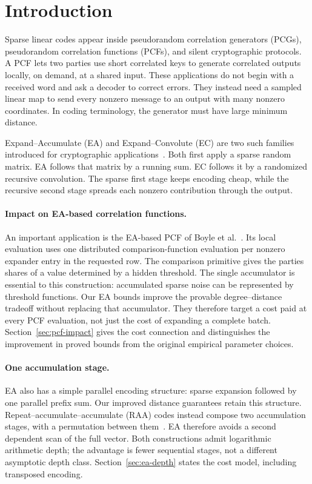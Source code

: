 \section{Introduction}
\label{sec:introduction}

Sparse linear codes appear inside pseudorandom correlation generators
(PCGs), pseudorandom correlation functions (PCFs), and silent cryptographic
protocols.  A PCF lets two parties use short correlated keys to generate
correlated outputs locally, on demand, at a shared input.  These applications
do not begin with a
received word and ask a decoder to correct errors.  They instead need a
sampled linear map to send every nonzero message to an output with many
nonzero coordinates.  In coding terminology, the generator must have large
minimum distance.

Expand--Accumulate (EA) and Expand--Convolute (EC) are two such families
introduced for cryptographic applications~\cite{EA,EC}.  Both first apply a
sparse random matrix.  EA follows that matrix by a running sum.  EC follows it
by a randomized recursive convolution.  The sparse first stage keeps encoding
cheap, while the recursive second stage spreads each nonzero contribution
through the output.

\paragraph{Impact on EA-based correlation functions.}
An important application is the EA-based PCF of Boyle et al.~\cite{EA}.
Its local evaluation uses one distributed comparison-function evaluation
per nonzero expander entry in the requested row.
The comparison primitive gives the parties shares of a value determined
by a hidden threshold.  The single accumulator is essential to this
construction: accumulated sparse noise can be represented by threshold
functions.  Our EA bounds improve the provable degree--distance tradeoff
without replacing that accumulator.  They therefore target a cost paid at
every PCF evaluation, not just the cost of expanding a complete batch.
Section~\ref{sec:pcf-impact} gives the cost connection and distinguishes
the improvement in proved bounds from the original empirical parameter choices.

\paragraph{One accumulation stage.}
EA also has a simple parallel encoding structure: sparse expansion followed
by one parallel prefix sum.  Our improved distance guarantees retain this
structure.  Repeat--accumulate--accumulate (RAA) codes instead compose two
accumulation stages, with a permutation between them~\cite[Remark~3.4]{EA}.
EA therefore avoids a second dependent scan of the full vector.
Both constructions admit logarithmic arithmetic depth; the advantage is
fewer sequential stages, not a different asymptotic depth class.
Section~\ref{sec:ea-depth} states the cost model, including transposed encoding.

